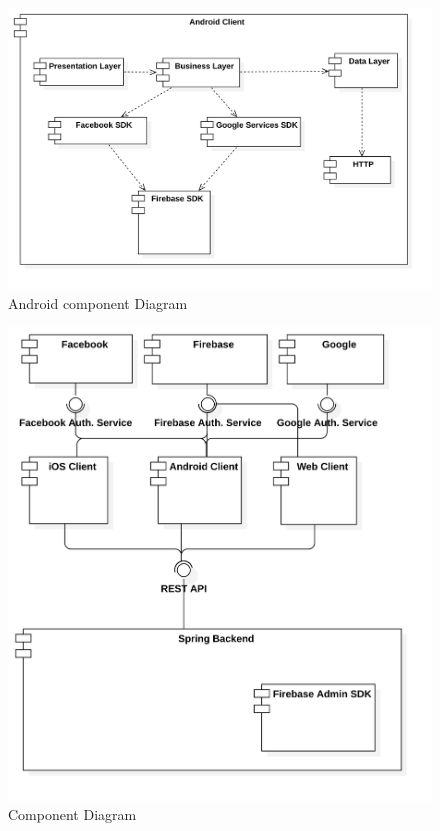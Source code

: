 \documentclass[thesis=B,english]{FITthesis}[2012/10/20]
\begin{document}
\begin{figure}[H]
\centering
  \includegraphics[scale=0.25]{androiddiagram}
  \caption{Android component Diagram}
  \label{fig:android-component}
\end{figure}


\begin{figure}[H]
	\centering
  \includegraphics[scale=0.25]{systemdiagram}
  \caption{Component Diagram}
  \label{fig:component}
\end{figure}
\end{document}
